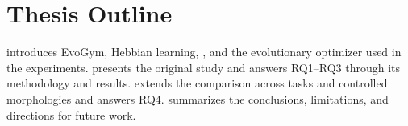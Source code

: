 \section{Thesis Outline}

 introduces EvoGym, Hebbian learning, \nchl{}, and the evolutionary optimizer used in the experiments.  presents the original study and answers RQ1--RQ3 through its methodology and results.  extends the comparison across tasks and controlled morphologies and answers RQ4.  summarizes the conclusions, limitations, and directions for future work.
